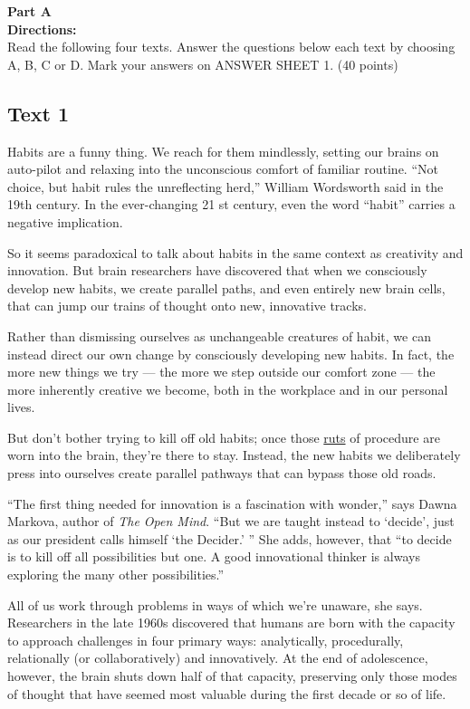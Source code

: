\noindent
\textbf{Part A}\\
\textbf{Directions:}\\
Read the following four texts. Answer the questions below each
text by choosing A, B, C or
D. Mark your answers
on ANSWER SHEET 1. (40 points)


\newpage
\subsection{Text 1}


Habits are a funny thing. We reach for them mindlessly, setting our
brains on auto-pilot and relaxing into the unconscious comfort of
familiar routine. ``Not choice, but habit rules the unreflecting herd,''
William Wordsworth said in the 19th century. In the ever-changing 21 st
century, even the word ``habit'' carries a negative implication.

So it seems paradoxical to talk about habits in the same context as
creativity and innovation. But brain researchers have discovered that
when we consciously develop new habits, we create parallel paths, and
even entirely new brain cells, that can jump our trains of thought onto
new, innovative tracks.

Rather than dismissing ourselves as unchangeable creatures of habit, we
can instead direct our own change by consciously developing new habits.
In fact, the more new things we try --- the more we step outside our
comfort zone --- the more inherently creative we become, both in the
workplace and in our personal lives.

But don't bother trying to kill off old habits; once
those \uline{ruts} of procedure are worn into the brain, they're
there to stay. Instead, the new habits we deliberately press into
ourselves create parallel pathways that can bypass those old roads.

``The first thing needed for innovation is a fascination with wonder,''
says Dawna Markova, author of \emph{The Open Mind}. ``But we are taught
instead to `decide', just as our president calls himself `the Decider.'
'' She adds, however, that ``to decide is to kill off all possibilities
but one. A good innovational thinker is always exploring the many other
possibilities.''

All of us work through problems in ways of which we're unaware, she
says. Researchers in the late 1960s discovered that humans are born with
the capacity to approach challenges in four primary ways: analytically,
procedurally, relationally (or collaboratively) and innovatively. At the
end of adolescence, however, the brain shuts down half of that capacity,
preserving only those modes of thought that have seemed most valuable
during the first decade or so of life.

